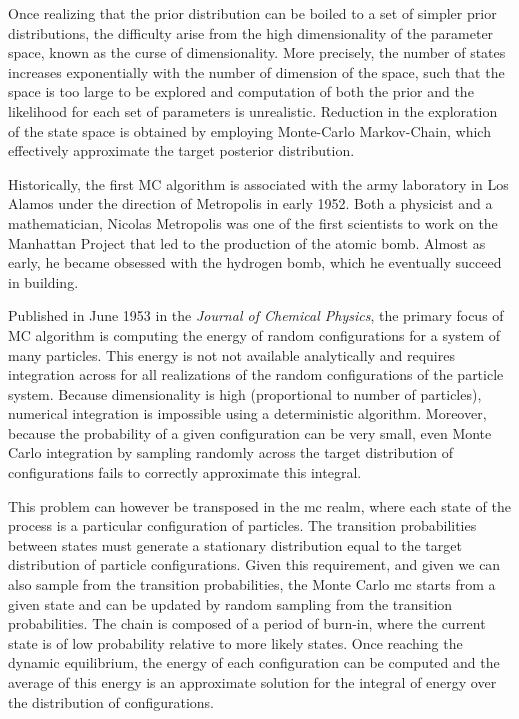 Once realizing that the \gls{prior} distribution can be boiled to a set of simpler \gls{prior} distributions, the difficulty arise from the high dimensionality of the parameter space, known as the curse of dimensionality.
More precisely, the number of states increases exponentially with the number of dimension of the space, such that the space is too large to be explored and computation of both the \gls{prior} and the \gls{likelihood} for each set of parameters is unrealistic.
Reduction in the exploration of the state space is obtained by employing Monte-Carlo Markov-Chain, which effectively approximate the target \gls{posterior} distribution.

Historically, the first \acrshort{MC} algorithm is associated with the army laboratory in Los Alamos under the direction of Metropolis in early 1952.
Both a physicist and a mathematician, Nicolas Metropolis was one of the first scientists to work on the Manhattan Project that led to the production of the atomic bomb.
Almost as early, he became obsessed with the hydrogen bomb, which he eventually succeed in building.

Published in June 1953 in the \textit{Journal of Chemical Physics}, the primary focus of \acrshort{MC} algorithm is computing the energy of random configurations for a system of many particles.
This energy is not not available analytically and requires integration across for all realizations of the random configurations of the particle system.
Because dimensionality is high (proportional to number of particles), numerical integration is impossible using a deterministic algorithm.
Moreover, because the probability of a given configuration can be very small, even Monte Carlo integration by sampling randomly across the target distribution of configurations fails to correctly approximate this integral.

This problem can however be transposed in the \gls{mc} realm, where each state of the process is a particular configuration of particles.
The {transition} probabilities between states must generate a stationary distribution equal to the target distribution of particle configurations.
Given this requirement, and given we can also sample from the {transition} probabilities, the Monte Carlo \gls{mc} starts from a given state and can be updated by random sampling from the {transition} probabilities.
The chain is composed of a period of burn-in, where the current state is of low probability relative to more likely states.
Once reaching the dynamic equilibrium, the energy of each configuration can be computed and the average of this energy is an approximate solution for the integral of energy over the distribution of configurations.

